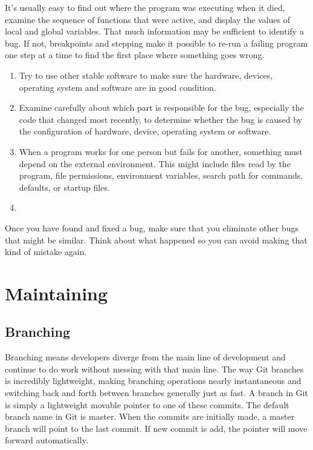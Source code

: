 \documentclass[draftclsnofoot,journal,onecolumn,12pt]{IEEEtran}
\begin{document}
It's usually easy to find out where the program was executing when it died, examine the sequence of functions that were active, and display the values of local and global variables. That much information may be sufficient to identify a bug. If not, breakpoints and stepping make it possible to re-run a failing program one step at a time to find the first place where something goes wrong.

\begin{enumerate}
  \item Try to use other stable software to make sure the hardware, devices, operating system and software are in good condition.
  \item Examine carefully about which part is responsible for the bug, especially the code that changed most recently, to determine whether the bug is caused by the configuration of hardware, device, operating system or software.
  \item When a program works for one person but fails for another, something must depend on the external environment. This might include files read by the program, file permissions, environment variables, search path for commands, defaults, or startup files.
  \item 
\end{enumerate}
Once you have found and fixed a bug, make sure that you eliminate other bugs that might be similar. Think about what happened so you can avoid making that kind of mistake again.

\section{Maintaining}


\subsection{Branching}
Branching means developers diverge from the main line of development and continue to do work without messing with that main line. The way Git branches is incredibly lightweight, making branching operations nearly instantaneous and switching back and forth between branches generally just as fast. A branch in Git is simply a lightweight movable pointer to one of these commits. The default branch name in Git is master. When the commits are initially made, a master branch will point to the last commit. If new commit is add, the pointer will move forward automatically.
\end{document}
